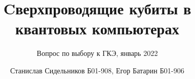 \documentclass{beamer}
\title{Cверхпроводящие кубиты в квантовых компьютерах}
\subtitle{Вопрос по выбору к ГКЭ, январь 2022}
\author{Станислав Сидельников Б01-908, Егор Батарин Б01-906}
\institute{Московский физико-технический институт}
\date{}
\begin{document}
	
	\begin{frame}
		\titlepage
	\end{frame}
	
\end{document}
